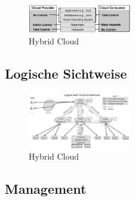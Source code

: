 \begin{figure}[H]
    \centering
	\includegraphics[width=0.4\textwidth]{Images/IaaSControl}
	\caption{Hybrid Cloud \cite{Badger}}
	\label{IaaSControl}
\end{figure}




\pagebreak
\subsection{Logische Sichtweise}
\begin{figure}[H]
    \centering
	\includegraphics[width=0.4\textwidth]{Images/IaaSLogic}
	\caption{Hybrid Cloud \cite{Badger}}
	\label{IaaSLogic}
\end{figure}

\subsection{Management}
\pagebreak